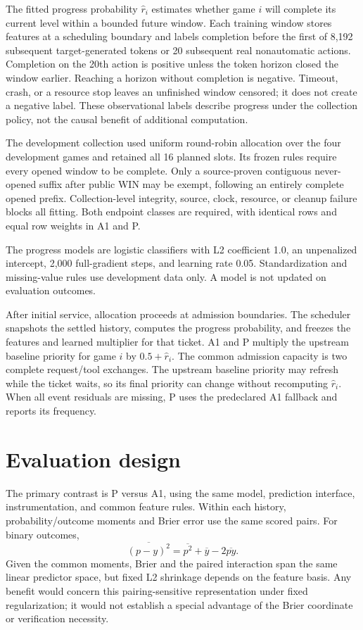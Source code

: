 \documentclass[11pt]{article}
\begin{document}
The fitted progress probability $\hat r_i$ estimates whether game $i$ will complete its current level within a bounded future window. Each training window stores features at a scheduling boundary and labels completion before the first of 8,192 subsequent target-generated tokens or 20 subsequent real nonautomatic actions. Completion on the 20th action is positive unless the token horizon closed the window earlier. Reaching a horizon without completion is negative. Timeout, crash, or a resource stop leaves an unfinished window censored; it does not create a negative label. These observational labels describe progress under the collection policy, not the causal benefit of additional computation.

The development collection used uniform round-robin allocation over the four development games and retained all 16 planned slots. Its frozen rules require every opened window to be complete. Only a source-proven contiguous never-opened suffix after public WIN may be exempt, following an entirely complete opened prefix. Collection-level integrity, source, clock, resource, or cleanup failure blocks all fitting. Both endpoint classes are required, with identical rows and equal row weights in A1 and P.

The progress models are logistic classifiers with L2 coefficient 1.0, an unpenalized intercept, 2,000 full-gradient steps, and learning rate 0.05. Standardization and missing-value rules use development data only. A model is not updated on evaluation outcomes.

After initial service, allocation proceeds at admission boundaries. The scheduler snapshots the settled history, computes the progress probability, and freezes the features and learned multiplier for that ticket. A1 and P multiply the upstream baseline priority for game $i$ by $0.5+\hat r_i$. The common admission capacity is two complete request/tool exchanges. The upstream baseline priority may refresh while the ticket waits, so its final priority can change without recomputing $\hat r_i$. When all event residuals are missing, P uses the predeclared A1 fallback and reports its frequency.

\section{Evaluation design}
The primary contrast is P versus A1, using the same model, prediction interface, instrumentation, and common feature rules. Within each history, probability/outcome moments and Brier error use the same scored pairs. For binary outcomes,
\[
\overline{(p-y)^2}=\overline{p^2}+\overline{y}-2\overline{py}.
\]
Given the common moments, Brier and the paired interaction span the same linear predictor space, but fixed L2 shrinkage depends on the feature basis. Any benefit would concern this pairing-sensitive representation under fixed regularization; it would not establish a special advantage of the Brier coordinate or verification necessity.
\end{document}
